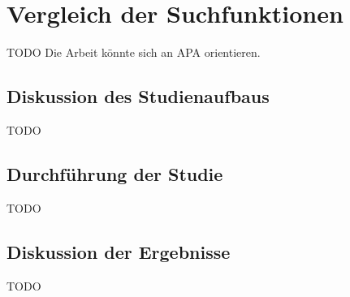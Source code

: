 \chapter{Vergleich der Suchfunktionen}
TODO Die Arbeit könnte sich an APA orientieren.

\section{Diskussion des Studienaufbaus}
TODO

\section{Durchführung der Studie}
TODO

\section{Diskussion der Ergebnisse}
TODO
